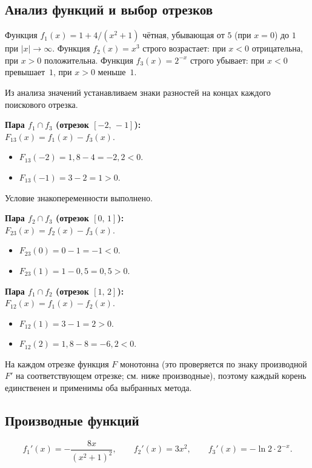 \documentclass[a4paper,12pt,titlepage,finall]{article}
\begin{document}
\subsection{Анализ функций и выбор отрезков}

Функция $f_1(x)=1+4/(x^2+1)$ чётная, убывающая от $5$ (при $x=0$) до $1$
при $|x|\to\infty$.
Функция $f_2(x)=x^3$ строго возрастает: при $x<0$ отрицательна,
при $x>0$ положительна.
Функция $f_3(x)=2^{-x}$ строго убывает: при $x<0$ превышает~$1$,
при $x>0$ меньше~$1$.

Из анализа значений устанавливаем знаки разностей на концах каждого
поискового отрезка.

\medskip
\textbf{Пара $f_1\cap f_3$ (отрезок $[-2,\,-1]$):}\\
$F_{13}(x)=f_1(x)-f_3(x)$.
\begin{itemize}
    \item $F_{13}(-2)=1{,}8-4=-2{,}2<0$.
    \item $F_{13}(-1)=3-2=1>0$.
\end{itemize}
Условие знакопеременности выполнено.

\textbf{Пара $f_2\cap f_3$ (отрезок $[0,\,1]$):}\\
$F_{23}(x)=f_2(x)-f_3(x)$.
\begin{itemize}
    \item $F_{23}(0)=0-1=-1<0$.
    \item $F_{23}(1)=1-0{,}5=0{,}5>0$.
\end{itemize}

\textbf{Пара $f_1\cap f_2$ (отрезок $[1,\,2]$):}\\
$F_{12}(x)=f_1(x)-f_2(x)$.
\begin{itemize}
    \item $F_{12}(1)=3-1=2>0$.
    \item $F_{12}(2)=1{,}8-8=-6{,}2<0$.
\end{itemize}

На каждом отрезке функция $F$ монотонна (это проверяется по знаку
производной $F'$ на соответствующем отрезке; см. ниже производные),
поэтому каждый корень единственен и применимы оба выбранных метода.

\subsection{Производные функций}

\[
f_1'(x)=-\frac{8x}{(x^2+1)^2},\qquad
f_2'(x)=3x^2,\qquad
f_3'(x)=-\ln 2\cdot 2^{-x}.
\]
\end{document}
